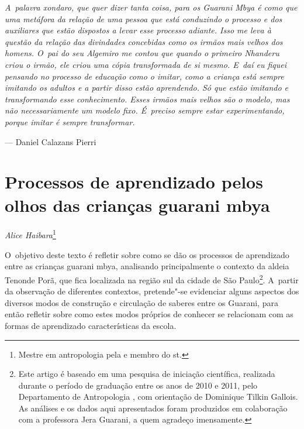 \clearpage

\vspace*{\fill}

\begin{flushleft}
\begin{minipage}[c]{0.85\textwidth}
\raggedright
\footnotesize
\emph{A~palavra \emph{xondaro}, que quer dizer tanta coisa, para os Guarani Mbya é
como que uma metáfora da relação de uma pessoa que está conduzindo o
processo e dos auxiliares que estão dispostos a levar esse processo
adiante. Isso me leva à questão da relação das divindades concebidas
como os irmãos mais velhos dos homens. O~pai do seu Algemiro me contou
que quando o primeiro \emph{Nhanderu} criou o irmão, ele criou uma cópia
transformada de si mesmo. E~daí eu fiquei pensando no processo de
educação como o imitar, como a criança está sempre imitando os adultos
e a partir disso estão aprendendo. Só que estão imitando e
transformando esse conhecimento. Esses irmãos mais velhos são o modelo,
mas não necessariamente um modelo fixo. É~preciso sempre estar
experimentando, porque imitar é sempre transformar.}

\smallskip
\hspace*{\fill}--- Daniel Calazans Pierri
\end{minipage}
\end{flushleft}

\chapter{Processos de aprendizado pelos olhos das crianças guarani mbya}
\begin{flushright}
\emph{Alice Haibara}\footnote{Mestre em antropologia pela  e membro do
st.}
\end{flushright}

\noindent
O~objetivo deste texto é refletir sobre como se dão os processos de
aprendizado entre as crianças guarani mbya, analisando principalmente o
contexto da aldeia Tenonde Porã, que fica localizada na região sul da
cidade de São Paulo\footnote{Este artigo é baseado em uma pesquisa de
iniciação científica, realizada durante o período de graduação entre os
anos de 2010 e 2011, pelo Departamento de Antropologia , com
orientação de Dominique Tilkin Gallois. As análises e os dados aqui
apresentados foram produzidos em colaboração com a professora Jera
Guarani, a quem agradeço imensamente.}. A~partir da observação de
diferentes contextos, pretende"-se evidenciar alguns aspectos dos
diversos modos de construção e circulação de saberes entre os Guarani,
para então refletir sobre como estes modos próprios de conhecer se
relacionam com as formas de aprendizado características da escola.

